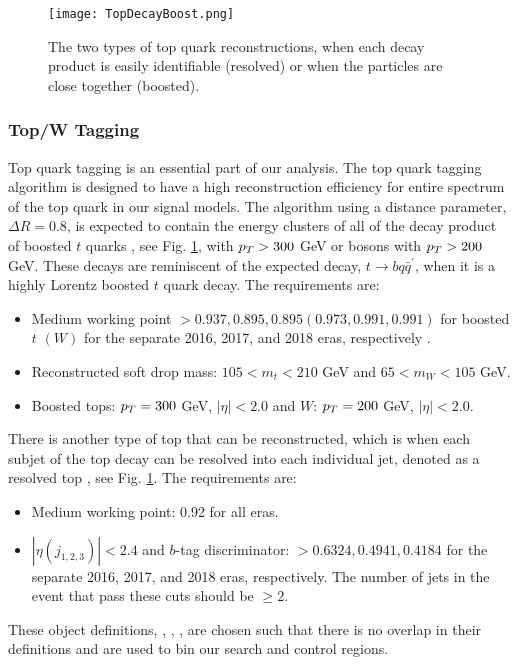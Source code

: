 \begin{figure}
 	\centering
	\texttt{[image: TopDecayBoost.png]}
 	\caption[Top Decays]{The two types of top quark reconstructions, when each decay product is easily identifiable (resolved) or when the particles are close together (boosted).}
 	\label{TopDecays} 
\end{figure}

\subsubsection{Top/W Tagging}\label{TopTagging}
Top quark tagging is an essential part of our analysis. The top quark tagging algorithm is designed to have a high reconstruction efficiency for entire \pt{} spectrum of the top quark in our signal models. The \antikt{} algorithm using a distance parameter, $\Delta R=0.8$, is expected to contain the energy clusters of all of the decay product of boosted $t$ quarks \cite{noauthor_top_nodate, noauthor_identification_nodate-1}, see Fig. \ref{TopDecays}, with $p_{T}>300$ GeV or \W{} bosons with $p_{T}>200$ GeV. These decays are reminiscent of the expected decay, $t\rightarrow bq\bar{q}^\prime$, when it is a highly Lorentz boosted $t$ quark decay. The requirements are:
\begin{itemize}
	\item Medium working point $>0.937, 0.895, 0.895 (0.973, 0.991, 0.991)$ for boosted $t$ $(W)$ for the separate 2016, 2017, and 2018 eras, respectively \cite{ganin_unsupervised_2015}.
	\item Reconstructed soft drop\cite{larkoski_soft_2014, dasgupta_towards_2013} mass: $105<m_t<210$ GeV and $65<m_W<105$ GeV.
	\item Boosted tops: $p_{T}=300$ GeV, $|\eta|<2.0$ and $W$: $p_{T}=200$ GeV, $|\eta|<2.0$.
\end{itemize}

There is another type of top that can be reconstructed, which is when each subjet of the top decay can be resolved into each individual jet, denoted as a resolved top \cite{ganin_unsupervised_2015}, see Fig. \ref{TopDecays}. The requirements are:
\begin{itemize}
	\item Medium working point: 0.92 for all eras.
	\item $|\eta(j_{1,2,3})|<2.4$ and $b$-tag discriminator: $>0.6324, 0.4941, 0.4184$ for the separate 2016, 2017, and 2018 eras, respectively. The number of jets in the event that pass these cuts should be $\geq2$.
\end{itemize}
These object definitions, \nt, \nw, \nrt, are chosen such that there is no overlap in their definitions and are used to bin our search and control regions. 


